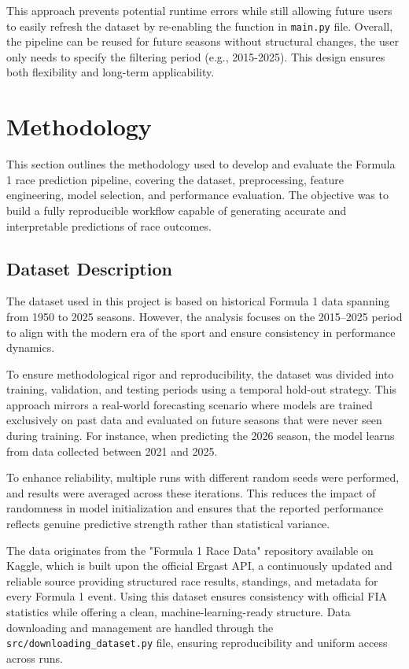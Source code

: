\documentclass[11pt,a4paper]{article}
\begin{document}
This approach prevents potential runtime errors while still allowing future users to easily refresh the dataset by re-enabling the function in \texttt{main.py} file. Overall, the pipeline can be reused for future seasons without structural changes, the user only needs to specify the filtering period (e.g., 2015-2025). This design ensures both flexibility and long-term applicability.



\section{Methodology}
\label{sec:methodology}

This section outlines the methodology used to develop and evaluate the Formula 1 race prediction pipeline, covering the dataset, preprocessing, feature engineering, model selection, and performance evaluation. The objective was to build a fully reproducible workflow capable of generating accurate and interpretable predictions of race outcomes.

\subsection{Dataset Description}
\label{subsec:dataset}

The dataset used in this project is based on historical Formula 1 data spanning from 1950 to 2025 seasons. However, the analysis focuses on the 2015–2025 period to align with the modern era of the sport and ensure consistency in performance dynamics.

To ensure methodological rigor and reproducibility, the dataset was divided into training, validation, and testing periods using a temporal hold-out strategy. This approach mirrors a real-world forecasting scenario where models are trained exclusively on past data and evaluated on future seasons that were never seen during training. For instance, when predicting the 2026 season, the model learns from data collected between 2021 and 2025.

To enhance reliability, multiple runs with different random seeds were performed, and results were averaged across these iterations. This reduces the impact of randomness in model initialization and ensures that the reported performance reflects genuine predictive strength rather than statistical variance.

The data originates from the "Formula 1 Race Data" repository available on Kaggle, which is built upon the official Ergast API, a continuously updated and reliable source providing structured race results, standings, and metadata for every Formula 1 event. Using this dataset ensures consistency with official FIA statistics while offering a clean, machine-learning-ready structure. Data downloading and management are handled through the \texttt{src/downloading\_dataset.py} file, ensuring reproducibility and uniform access across runs.
\end{document}
